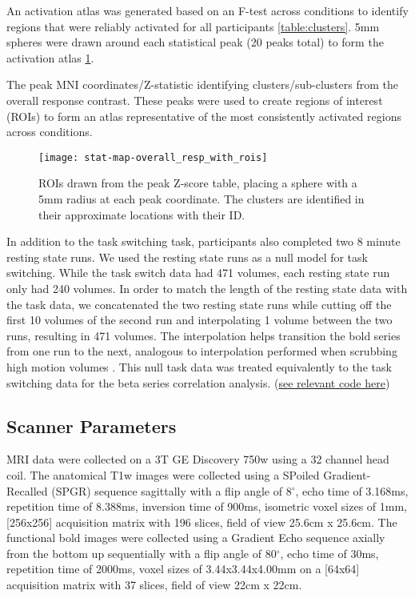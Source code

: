 \documentclass[10pt,letterpaper]{article}
\begin{document}
An activation atlas was generated based on an F-test across conditions
to identify regions that were reliably activated for all participants \ref{table:clusters}.
5mm spheres were drawn around each statistical peak (20 peaks total)
to form the activation atlas \ref{fig:methroimap}.

\begin{table}[H]
  \caption{
    The peak MNI coordinates/Z-statistic identifying clusters/sub-clusters from the overall
    response contrast.
    These peaks were used to create regions of interest (ROIs) to form an atlas representative
    of the most consistently activated regions across conditions.
  }
  \label{table:clusters}
\end{table}


\begin{figure}[H]
  \centering
  \texttt{[image: stat-map-overall\_resp\_with\_rois]}
  \caption{
    ROIs drawn from the peak Z-score table, placing a sphere with a 5mm radius
    at each peak coordinate.
    The clusters are identified in their approximate locations
    with their ID.
  }
  \label{fig:methroimap}
\end{figure}

In addition to the task switching task, participants also completed
two 8 minute resting state runs.
We used the resting state runs as a null model for task switching.
While the task switch data had 471 volumes, each resting state run only had
240 volumes.
In order to match the length of the resting state data with the task data, we concatenated
the two resting state runs while cutting off the first 10 volumes of the second run
and interpolating 1 volume between the two runs, resulting in 471 volumes.
The interpolation helps transition the bold series from one run to the next,
analogous to interpolation performed when scrubbing high motion volumes \cite{Power2014a}. 
This null task data was treated equivalently to the task switching data for the
beta series correlation analysis.
(\href{https://github.com/jdkent/validateBetaSeries/tree/195ad5b4201971038dbbf8f73a3c537caf032743}{see relevant code here})

\subsection*{Scanner Parameters}
\label{methods:scanner}

MRI data were collected on a 3T GE Discovery 750w using a 32 channel head coil.
The anatomical T1w images were collected using a SPoiled Gradient-Recalled (SPGR) sequence
sagittally with a flip angle of 8$^{\circ}$, echo time of 3.168ms,
repetition time of 8.388ms, inversion time of 900ms, isometric voxel sizes of 1mm,
[256x256] acquisition matrix with 196 slices, field of view 25.6cm x 25.6cm.
The functional bold images were collected using a Gradient Echo sequence axially from
the bottom up sequentially with a flip angle of 80$^{\circ}$, echo time of 30ms,
repetition time of 2000ms, voxel sizes of 3.44x3.44x4.00mm on a [64x64] acquisition matrix
with 37 slices, field of view 22cm x 22cm.
\end{document}
